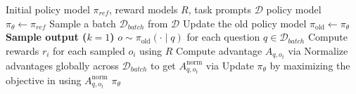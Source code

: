 \begin{algorithm}
\caption{\ours when $k=1$}\label{algo:main}
\begin{algorithmic}[1]
\Require Initial policy model $\pi_{ref}$, reward models $R$, task prompts $\mathcal{D}$
\State policy model $\pi_{\theta} \gets \pi_{ref}$
    \State Sample a batch $\mathcal{D}_{batch}$ from $\mathcal{D}$
    \State Update the old policy model $\pi_{\text{old}} \gets \pi_{\theta}$
    \State \textbf{Sample output ($k=1$)} $o \sim \pi_{\text{old}}(\cdot \mid q)$ for each question $q \in \mathcal{D}_{batch}$
    \State Compute rewards $r_i$ for each sampled $o_i$ using $R$
    \State Compute advantage $A_{q,o_t}$ via 
    \State Normalize advantages globally across $\mathcal{D}_{batch}$ to get $A_{q,o_t}^{\text{norm}}$ via 
        \State Update $\pi_{\theta}$ by maximizing the objective in  using $A_{q,o_t}^{\text{norm}}$
    \EndFor
\EndFor
\Ensure $\pi_{\theta}$
\end{algorithmic}
\end{algorithm}
